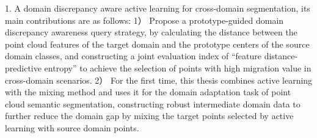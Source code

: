 1. A domain discrepancy aware active learning for cross-domain segmentation, its main contributions are as follows: 
1） Propose a prototype-guided domain discrepancy awareness query strategy, by calculating the distance between the point cloud features of the target domain and the prototype centers of the source domain classes, and constructing a joint evaluation index of “feature distance-predictive entropy” to achieve the selection of points with high migration value in cross-domain scenarios. 
2） For the first time, this thesis combines active learning with the mixing method and uses it for the domain adaptation task of point cloud semantic segmentation, constructing robust intermediate domain data to further reduce the domain gap by mixing the target points selected by active learning with source domain points.

